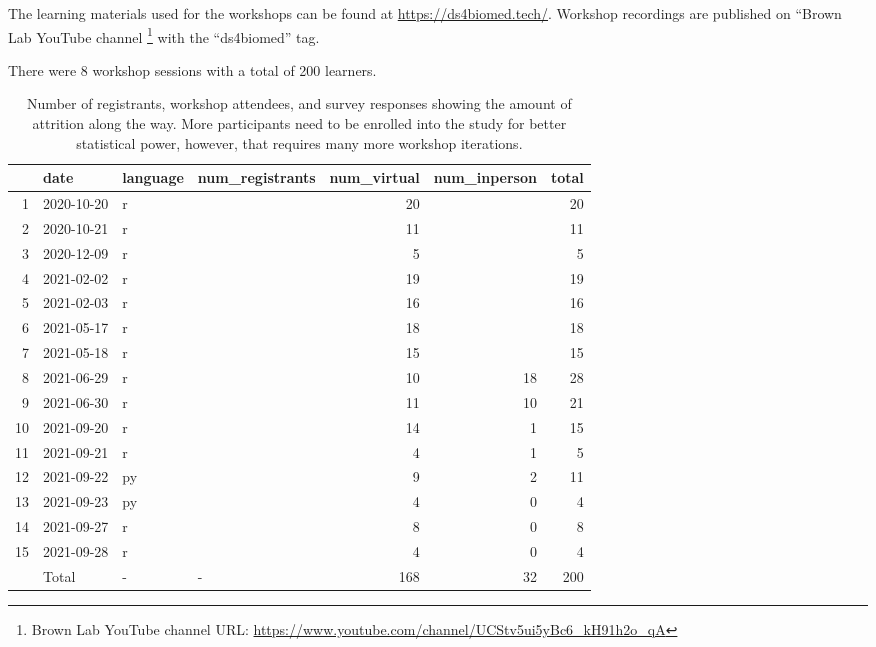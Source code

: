 \documentclass[030-workshop.tex]{subfiles}
\begin{document}
    The learning materials used for the workshops can be found at
    \url{https://ds4biomed.tech/}.
    Workshop recordings are published on ``Brown Lab YouTube channel
    \footnote{Brown Lab YouTube channel URL: \url{https://www.youtube.com/channel/UCStv5ui5yBc6_kH91h2o_qA}}
    with the ``ds4biomed'' tag.

    There were 8 workshop sessions %
    with a total of 200 learners.

    \begin{table}[ht]
        \centering
        \caption[Workshop Registration and Survey Counts]
            {Number of registrants, workshop attendees, and survey responses showing the amount of attrition along the way.
             More participants need to be enrolled into the study for better statistical power,
             however, that requires many more workshop iterations.
            }
        \begin{tabular}{rlllrrr}
            \hline
            & date & language & num\_registrants & num\_virtual & num\_inperson & total \\
            \hline
            1 & 2020-10-20 & r &  &  20 &  &  20 \\
            2 & 2020-10-21 & r &  &  11 &  &  11 \\
            3 & 2020-12-09 & r &  &   5 &  &   5 \\
            4 & 2021-02-02 & r &  &  19 &  &  19 \\
            5 & 2021-02-03 & r &  &  16 &  &  16 \\
            6 & 2021-05-17 & r &  &  18 &  &  18 \\
            7 & 2021-05-18 & r &  &  15 &  &  15 \\
            8 & 2021-06-29 & r &  &  10 &  18 &  28 \\
            9 & 2021-06-30 & r &  &  11 &  10 &  21 \\
            10 & 2021-09-20 & r &  &  14 &   1 &  15 \\
            11 & 2021-09-21 & r &  &   4 &   1 &   5 \\
            12 & 2021-09-22 & py &  &   9 &   2 &  11 \\
            13 & 2021-09-23 & py &  &   4 &   0 &   4 \\
            14 & 2021-09-27 & r &  &   8 &   0 &   8 \\
            15 & 2021-09-28 & r &  &   4 &   0 &   4 \\
               & Total & - & - & 168 &  32 & 200 \\
        \hline
    \end{tabular}
    \label{tab:workshop-counts}
    \end{table}
\end{document}
